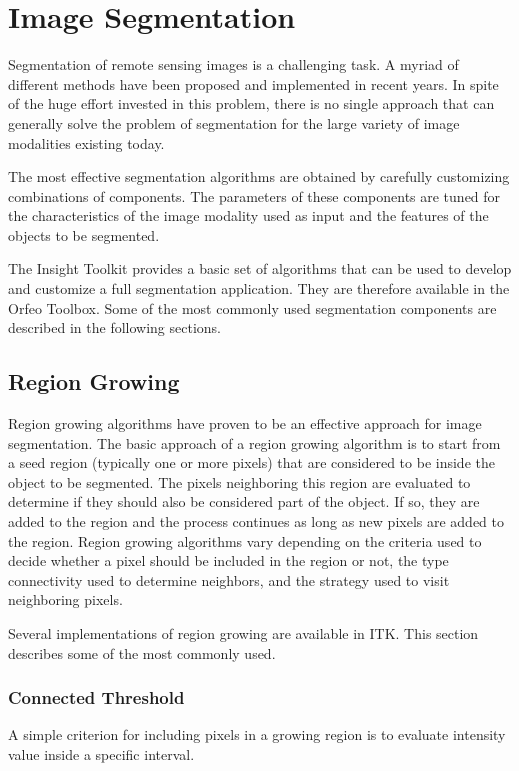 \chapter{Image Segmentation}
Segmentation of remote sensing images is a challenging task. A myriad
of different methods have been proposed and implemented in recent
years. In spite of the huge effort invested in this problem, there is
no single approach that can generally solve the problem of
segmentation for the large variety of image modalities existing today.

The most effective segmentation algorithms are obtained by carefully
customizing combinations of components. The parameters of these components are
tuned for the characteristics of the image modality used as input and the
features of the objects to be segmented. 

The Insight Toolkit provides a basic set of algorithms that can be used to
develop and customize a full segmentation application. They are
therefore available in the Orfeo Toolbox. Some of the most
commonly used segmentation components are described in the following
sections.


\section{Region Growing}

Region growing algorithms have proven to be an effective approach for image
segmentation. The basic approach of a region growing algorithm is to start
from a seed region (typically one or more pixels) that are considered to be
inside the object to be segmented. The pixels neighboring this region are
evaluated to determine if they should also be considered part of the
object. If so, they are added to the region and the process continues as long
as new pixels are added to the region.  Region growing algorithms vary
depending on the criteria used to decide whether a pixel should be included
in the region or not, the type connectivity used to determine neighbors, and
the strategy used to visit neighboring pixels.

Several implementations of region growing are available in ITK.  This section
describes some of the most commonly used.

\subsection{Connected Threshold}

A simple criterion for including pixels in a growing region is to evaluate
intensity value inside a specific interval.

